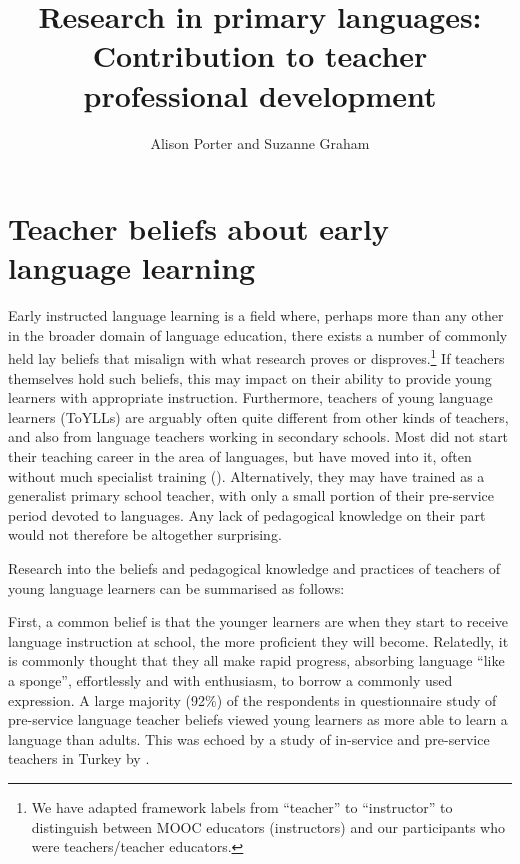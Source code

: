 \documentclass[output=paper]{langscibook}
\author{Alison Porter\affiliation{University of Southampton\orcid{}} and Suzanne Graham\affiliation{University of Reading}\orcid{}}
\title[Research in primary languages]{Research in primary languages: Contribution to teacher professional development}
\begin{document}
\maketitle 

\section{Teacher beliefs about early language learning}\label{sec:porter:1}

Early instructed language learning is a field where, perhaps more than any other in the broader domain of language education, there exists a number of commonly held lay beliefs that misalign with what research proves or disproves.\footnote{We have adapted  framework labels from ``teacher'' to ``instructor'' to distinguish between MOOC educators (instructors) and our participants who were teachers/teacher educators.}  If teachers themselves hold such beliefs, this may impact on their ability to provide young learners with appropriate instruction. Furthermore, teachers of young language learners (ToYLLs) are arguably often quite different from other kinds of teachers, and also from language teachers working in secondary schools. Most did not start their teaching career in the area of languages, but have moved into it, often without much specialist training (\citealt{GartonEtAl2011}). Alternatively, they may have trained as a generalist primary school teacher, with only a small portion of their pre-service period devoted to languages. Any lack of pedagogical knowledge on their part would not therefore be altogether surprising.

Research into the beliefs and pedagogical knowledge and practices of teachers of young language learners can be summarised as follows:

First, a common belief is that the younger learners are when they start to receive language instruction at school, the more proficient they will become. Relatedly, it is commonly thought that they all make rapid progress, absorbing language ``like a sponge'', effortlessly and with enthusiasm, to borrow a commonly used expression. A large majority (92\%) of the respondents in  questionnaire study of pre-service language teacher beliefs viewed young learners as more able to learn a language than adults. This was echoed by a study of in-service and pre-service teachers in Turkey by \citet{KocamanCansiz2012}.
\end{document}
